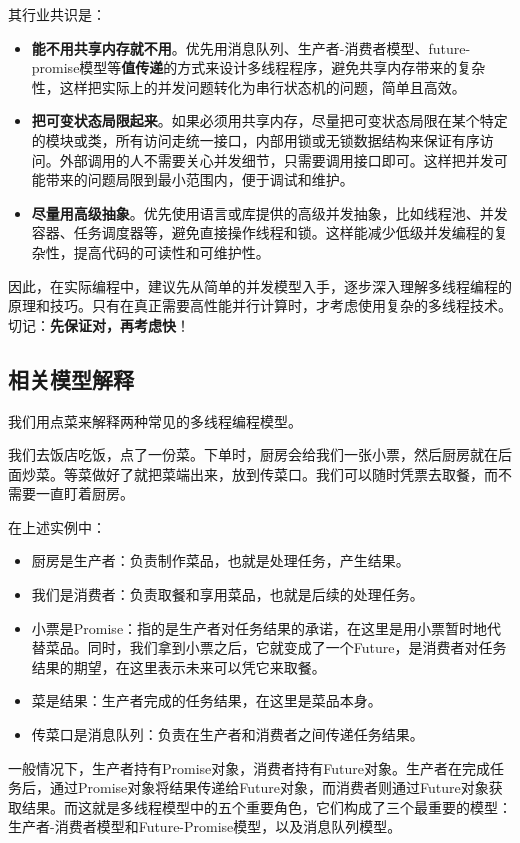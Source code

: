其行业共识是：
\begin{itemize}
    \item \textbf{能不用共享内存就不用}。优先用消息队列、生产者-消费者模型、future-promise模型等\textbf{值传递}的方式来设计多线程程序，避免共享内存带来的复杂性，这样把实际上的并发问题转化为串行状态机的问题，简单且高效。
    \item \textbf{把可变状态局限起来}。如果必须用共享内存，尽量把可变状态局限在某个特定的模块或类，所有访问走统一接口，内部用锁或无锁数据结构来保证有序访问。外部调用的人不需要关心并发细节，只需要调用接口即可。这样把并发可能带来的问题局限到最小范围内，便于调试和维护。
    \item \textbf{尽量用高级抽象}。优先使用语言或库提供的高级并发抽象，比如线程池、并发容器、任务调度器等，避免直接操作线程和锁。这样能减少低级并发编程的复杂性，提高代码的可读性和可维护性。
\end{itemize}

因此，在实际编程中，建议先从简单的并发模型入手，逐步深入理解多线程编程的原理和技巧。只有在真正需要高性能并行计算时，才考虑使用复杂的多线程技术。切记：\textbf{先保证对，再考虑快}！

\subsection{相关模型解释}

我们用点菜来解释两种常见的多线程编程模型。

我们去饭店吃饭，点了一份菜。下单时，厨房会给我们一张小票，然后厨房就在后面炒菜。等菜做好了就把菜端出来，放到传菜口。我们可以随时凭票去取餐，而不需要一直盯着厨房。

在上述实例中：
\begin{itemize}
    \item 厨房是生产者：负责制作菜品，也就是处理任务，产生结果。
    \item 我们是消费者：负责取餐和享用菜品，也就是后续的处理任务。
    \item 小票是Promise：指的是生产者对任务结果的承诺，在这里是用小票暂时地代替菜品。同时，我们拿到小票之后，它就变成了一个Future，是消费者对任务结果的期望，在这里表示未来可以凭它来取餐。
    \item 菜是结果：生产者完成的任务结果，在这里是菜品本身。
    \item 传菜口是消息队列：负责在生产者和消费者之间传递任务结果。
\end{itemize}

一般情况下，生产者持有Promise对象，消费者持有Future对象。生产者在完成任务后，通过Promise对象将结果传递给Future对象，而消费者则通过Future对象获取结果。而这就是多线程模型中的五个重要角色，它们构成了三个最重要的模型：生产者-消费者模型和Future-Promise模型，以及消息队列模型。

